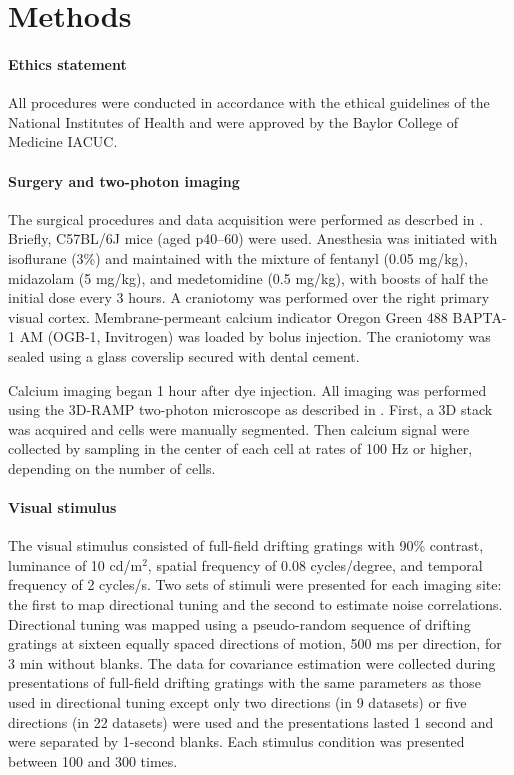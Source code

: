 \documentclass[10pt]{article}
\begin{document}
\section*{Methods}
\paragraph{Ethics statement}
All procedures were conducted in accordance with the ethical guidelines of the National Institutes of Health and were approved by the Baylor College of Medicine IACUC. 

\paragraph{Surgery and two-photon imaging}
The surgical procedures and data acquisition were performed as descrbed in \cite{Cotton:2013}. Briefly, C57BL/6J mice (aged p40--60) were used. Anesthesia was initiated with isoflurane (3\%) and maintained with the mixture of fentanyl (0.05 mg/kg), midazolam (5 mg/kg), and medetomidine (0.5 mg/kg), with boosts of half the initial dose every 3 hours.  A craniotomy was performed over the right primary visual cortex.  Membrane-permeant calcium indicator Oregon Green 488 BAPTA-1 AM (OGB-1, Invitrogen) was loaded by bolus injection.  The craniotomy was sealed using a glass coverslip secured with dental cement. 

Calcium imaging began 1 hour after dye injection.  All imaging was performed using the 3D-RAMP two-photon microscope as described in \cite{Cotton:2013}. First, a 3D stack was acquired and cells were manually segmented. Then calcium signal were collected by sampling in the center of each cell at rates of 100 Hz or higher, depending on the number of cells.

\paragraph{Visual stimulus}
The visual stimulus consisted of full-field drifting gratings with 90\% contrast, luminance of 10 cd/m$^2$, spatial frequency of 0.08 cycles/degree, and temporal frequency of 2 cycles/s. Two sets of stimuli were presented for each imaging site: the first to map directional tuning and the second to estimate noise correlations. Directional tuning was mapped using a pseudo-random sequence of drifting gratings at sixteen equally spaced directions of motion, 500 ms per direction, for 3 min without blanks. The data for covariance estimation were collected during presentations of full-field drifting gratings with the same parameters as those used in directional tuning except only two directions (in 9 datasets) or five directions (in 22 datasets) were used and the presentations lasted 1 second and were separated by 1-second blanks.  Each stimulus condition was presented between 100 and 300 times.
\end{document}

